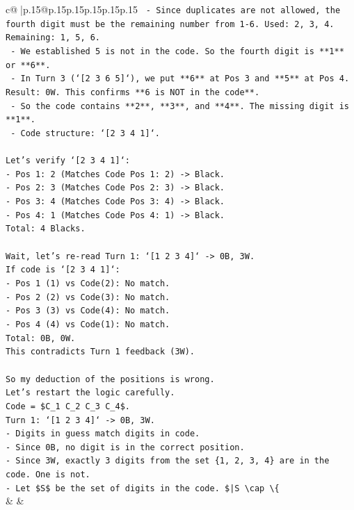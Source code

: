 \documentclass{article}
\begin{document}
{\begin{supertabular}{c@{$\;$}|p{.15\linewidth}@{}p{.15\linewidth}p{.15\linewidth}p{.15\linewidth}p{.15\linewidth}p{.15\linewidth}}
{{{\texttt{    {-} Since duplicates are not allowed, the fourth digit must be the remaining number from 1{-}6. Used: 2, 3, 4. Remaining: 1, 5, 6.} \\
\texttt{    {-} We established 5 is not in the code. So the fourth digit is **1** or **6**.} \\
\texttt{    {-} In Turn 3 (`{[}2 3 6 5{]}`), we put **6** at Pos 3 and **5** at Pos 4. Result: 0W. This confirms **6 is NOT in the code**.} \\
\texttt{    {-} So the code contains **2**, **3**, and **4**. The missing digit is **1**.} \\
\texttt{    {-} Code structure: `{[}2 3 4 1{]}`.} \\
\\ 
\texttt{Let's verify `{[}2 3 4 1{]}`:} \\
\texttt{{-} Pos 1: 2 (Matches Code Pos 1: 2) {-}> Black.} \\
\texttt{{-} Pos 2: 3 (Matches Code Pos 2: 3) {-}> Black.} \\
\texttt{{-} Pos 3: 4 (Matches Code Pos 3: 4) {-}> Black.} \\
\texttt{{-} Pos 4: 1 (Matches Code Pos 4: 1) {-}> Black.} \\
\texttt{Total: 4 Blacks.} \\
\\ 
\texttt{Wait, let's re{-}read Turn 1: `{[}1 2 3 4{]}` {-}> 0B, 3W.} \\
\texttt{If code is `{[}2 3 4 1{]}`:} \\
\texttt{{-} Pos 1 (1) vs Code(2): No match.} \\
\texttt{{-} Pos 2 (2) vs Code(3): No match.} \\
\texttt{{-} Pos 3 (3) vs Code(4): No match.} \\
\texttt{{-} Pos 4 (4) vs Code(1): No match.} \\
\texttt{Total: 0B, 0W.} \\
\texttt{This contradicts Turn 1 feedback (3W).} \\
\\ 
\texttt{So my deduction of the positions is wrong.} \\
\texttt{Let's restart the logic carefully.} \\
\texttt{Code = \$C\_1 C\_2 C\_3 C\_4\$.} \\
\texttt{Turn 1: `{[}1 2 3 4{]}` {-}> 0B, 3W.} \\
\texttt{{-} Digits in guess match digits in code.} \\
\texttt{{-} Since 0B, no digit is in the correct position.} \\
\texttt{{-} Since 3W, exactly 3 digits from the set \{1, 2, 3, 4\} are in the code. One is not.} \\
\texttt{{-} Let \$S\$ be the set of digits in the code. \$|S \textbackslash{}cap \textbackslash{}\{} \\
            }
        }
    }
    & & \\ \\


\end{supertabular}}
\end{document}
